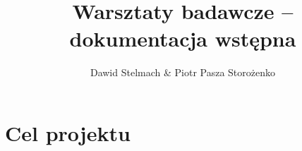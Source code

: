 \documentclass[a4paper]{mwart}
\author{Dawid Stelmach \& Piotr Pasza Storożenko}
\title{Warsztaty badawcze -- dokumentacja wstępna}
\begin{document}
\maketitle

\section{Cel projektu}
\end{document}
